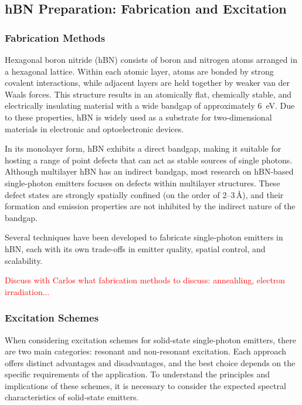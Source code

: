 \subsection{\label{sec:source_prep}hBN Preparation: Fabrication and Excitation}

\subsubsection{Fabrication Methods}

Hexagonal boron nitride (hBN) consists of boron and nitrogen atoms arranged in a hexagonal lattice. Within each atomic layer, atoms are bonded by strong covalent interactions, while adjacent layers are held together by weaker van der Waals forces. This structure results in an atomically flat, chemically stable, and electrically insulating material with a wide bandgap of approximately 6~eV. Due to these properties, hBN is widely used as a substrate for two-dimensional materials in electronic and optoelectronic devices.

In its monolayer form, hBN exhibits a direct bandgap, making it suitable for hosting a range of point defects that can act as stable sources of single photons. Although multilayer hBN has an indirect bandgap, most research on hBN-based single-photon emitters focuses on defects within multilayer structures. These defect states are strongly spatially confined (on the order of 2--3\,\AA), and their formation and emission properties are not inhibited by the indirect nature of the bandgap.

Several techniques have been developed to fabricate single-photon emitters in hBN, each with its own trade-offs in emitter quality, spatial control, and scalability. 

\textcolor{red}{Discuss with Carlos what fabrication methods to discuss: anneahling, electron irradiation...}





\subsubsection{Excitation Schemes}

When considering excitation schemes for solid-state single-photon emitters, there are two main categories: resonant and non-resonant excitation. Each approach offers distinct advantages and disadvantages, and the best choice depends on the specific requirements of the application. To understand the principles and implications of these schemes, it is necessary to consider the expected spectral characteristics of solid-state emitters.

